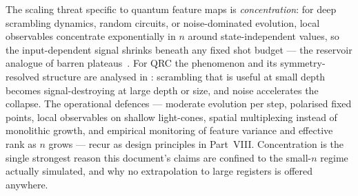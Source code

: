 The scaling threat specific to quantum feature maps is
\emph{concentration}: for deep scrambling dynamics, random circuits, or
noise-dominated evolution, local observables concentrate exponentially in $n$
around state-independent values, so the input-dependent signal shrinks beneath
any fixed shot budget --- the reservoir analogue of barren
plateaus~\citep{mcclean2018barren}. For QRC the phenomenon and its
symmetry-resolved structure are analysed in
\citet{sannia2025exponential,xiong2025role}: scrambling that is useful at
small depth becomes signal-destroying at large depth or size, and noise
accelerates the collapse. The operational defences --- moderate evolution per
step, polarised fixed points, local observables on shallow light-cones,
spatial multiplexing instead of monolithic growth, and empirical monitoring of
feature variance and effective rank as $n$ grows --- recur as design principles
in Part~VIII. Concentration is the single strongest reason this document's
claims are confined to the small-$n$ regime actually simulated, and why no
extrapolation to large registers is offered anywhere.
